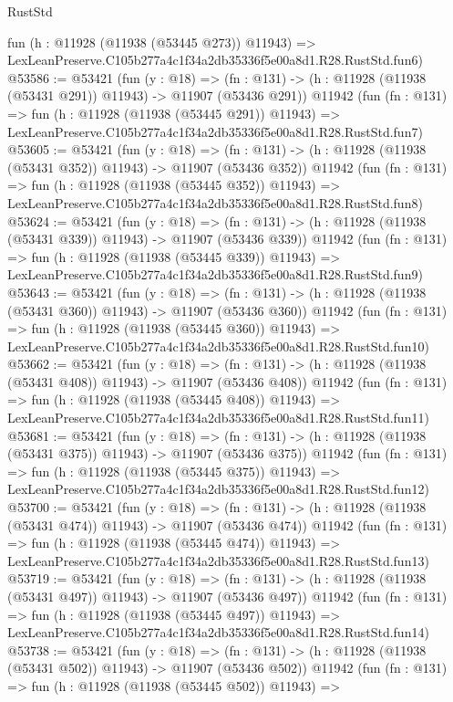 \begin{lexlean}{RustStd}
\begin{coremodule}
    fun (h : @11928 (@11938 (@53445 @273)) @11943) =>
    LexLeanPreserve.C105b277a4c1f34a2db35336f5e00a8d1.R28.RustStd.fun6)
@53586 := @53421
    (fun (y : @18) =>
    (fn : @131) -> (h : @11928 (@11938 (@53431 @291)) @11943) -> @11907 (@53436 @291))
    @11942
    (fun (fn : @131) =>
    fun (h : @11928 (@11938 (@53445 @291)) @11943) =>
    LexLeanPreserve.C105b277a4c1f34a2db35336f5e00a8d1.R28.RustStd.fun7)
@53605 := @53421
    (fun (y : @18) =>
    (fn : @131) -> (h : @11928 (@11938 (@53431 @352)) @11943) -> @11907 (@53436 @352))
    @11942
    (fun (fn : @131) =>
    fun (h : @11928 (@11938 (@53445 @352)) @11943) =>
    LexLeanPreserve.C105b277a4c1f34a2db35336f5e00a8d1.R28.RustStd.fun8)
@53624 := @53421
    (fun (y : @18) =>
    (fn : @131) -> (h : @11928 (@11938 (@53431 @339)) @11943) -> @11907 (@53436 @339))
    @11942
    (fun (fn : @131) =>
    fun (h : @11928 (@11938 (@53445 @339)) @11943) =>
    LexLeanPreserve.C105b277a4c1f34a2db35336f5e00a8d1.R28.RustStd.fun9)
@53643 := @53421
    (fun (y : @18) =>
    (fn : @131) -> (h : @11928 (@11938 (@53431 @360)) @11943) -> @11907 (@53436 @360))
    @11942
    (fun (fn : @131) =>
    fun (h : @11928 (@11938 (@53445 @360)) @11943) =>
    LexLeanPreserve.C105b277a4c1f34a2db35336f5e00a8d1.R28.RustStd.fun10)
@53662 := @53421
    (fun (y : @18) =>
    (fn : @131) -> (h : @11928 (@11938 (@53431 @408)) @11943) -> @11907 (@53436 @408))
    @11942
    (fun (fn : @131) =>
    fun (h : @11928 (@11938 (@53445 @408)) @11943) =>
    LexLeanPreserve.C105b277a4c1f34a2db35336f5e00a8d1.R28.RustStd.fun11)
@53681 := @53421
    (fun (y : @18) =>
    (fn : @131) -> (h : @11928 (@11938 (@53431 @375)) @11943) -> @11907 (@53436 @375))
    @11942
    (fun (fn : @131) =>
    fun (h : @11928 (@11938 (@53445 @375)) @11943) =>
    LexLeanPreserve.C105b277a4c1f34a2db35336f5e00a8d1.R28.RustStd.fun12)
@53700 := @53421
    (fun (y : @18) =>
    (fn : @131) -> (h : @11928 (@11938 (@53431 @474)) @11943) -> @11907 (@53436 @474))
    @11942
    (fun (fn : @131) =>
    fun (h : @11928 (@11938 (@53445 @474)) @11943) =>
    LexLeanPreserve.C105b277a4c1f34a2db35336f5e00a8d1.R28.RustStd.fun13)
@53719 := @53421
    (fun (y : @18) =>
    (fn : @131) -> (h : @11928 (@11938 (@53431 @497)) @11943) -> @11907 (@53436 @497))
    @11942
    (fun (fn : @131) =>
    fun (h : @11928 (@11938 (@53445 @497)) @11943) =>
    LexLeanPreserve.C105b277a4c1f34a2db35336f5e00a8d1.R28.RustStd.fun14)
@53738 := @53421
    (fun (y : @18) =>
    (fn : @131) -> (h : @11928 (@11938 (@53431 @502)) @11943) -> @11907 (@53436 @502))
    @11942
    (fun (fn : @131) =>
    fun (h : @11928 (@11938 (@53445 @502)) @11943) =>

\end{coremodule}
\end{lexlean}
